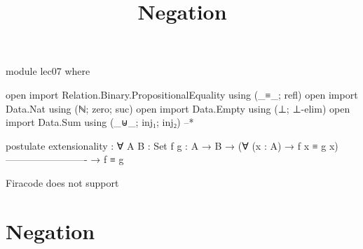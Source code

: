 \documentclass{lecturenotes}
\title{Negation}
\begin{document}
\maketitle

\begin{code}
module lec07 where

open import Relation.Binary.PropositionalEquality using (_≡_; refl)
open import Data.Nat using (ℕ; zero; suc)
open import Data.Empty using (⊥; ⊥-elim)
open import Data.Sum using (_⊎_; inj₁; inj₂) --*

postulate
  extensionality : ∀ {A B : Set} {f g : A → B}
    → (∀ (x : A) → f x ≡ g x)
    -------------------------
    → f ≡ g
\end{code}
{\tiny* Firacode does not support \uplus}

\section{Negation}
\label{sec:neg}
\end{document}
